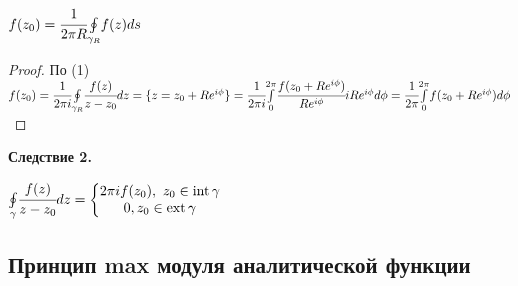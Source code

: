 \documentclass[draft]{report}
\newcommand{\mint}[2]{\underset{#1}{\overset{#2}{\int}}}
\newcommand{\moint}[1]{\underset{#1}{\oint}}
\newcommand{\Int}{\mathop{\mathrm{int}}\nolimits}
\newcommand{\Ext}{\mathop{\mathrm{ext}}\nolimits}
\newcommand{\g}{\gamma}
\renewcommand{\f}{\phi}
\newcommand{\sys}[1]{\left\{\begin{matrix}#1\end{matrix}\right.}
\theoremstyle{remark}
\begin{document}
$f(z_0)=\cfrac{1}{2\pi R}\moint{\g_R}f(z)ds$
\begin{proof}
По (1) $f(z_0)=\cfrac{1}{2\pi i}\moint{\g_R}\cfrac{f(z)}{z-z_0}dz=\{z=z_0+Re^{i\f}\}=\cfrac{1}{2\pi i}\mint{0}{2\pi}\cfrac{f(z_0+Re^{i\f})}{Re^{i\f}}iRe^{i\f}d\f=\cfrac{1}{2\pi}\mint{0}{2\pi}f(z_0+Re^{i\f})d\f$
\end{proof}

{\bfseries Следствие 2.}

$\moint{\g}\cfrac{f(z)}{z-z_0}dz=\sys{2\pi if(z_0),\ z_0\in\Int \g \\ 0, z_0\in\Ext\g}$

\subsection{Принцип max модуля аналитической функции}
\end{document}
